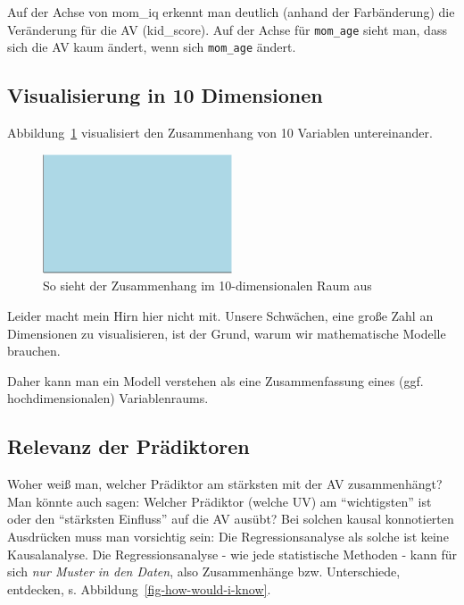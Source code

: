 \documentclass[
  a4paper,
  DIV=11]{scrreprt}
\theoremstyle{definition}
\theoremstyle{remark}
\begin{document}
Auf der Achse von mom\_iq erkennt man deutlich (anhand der Farbänderung)
die Veränderung für die AV (kid\_score). Auf der Achse für
\texttt{mom\_age} sieht man, dass sich die AV kaum ändert, wenn sich
\texttt{mom\_age} ändert.

\hypertarget{visualisierung-in-10-dimensionen}{%
\subsection{Visualisierung in 10
Dimensionen}\label{visualisierung-in-10-dimensionen}}

Abbildung~\ref{fig-ten-dims} visualisiert den Zusammenhang von 10
Variablen untereinander.

\begin{figure}

{\centering \includegraphics[width=0.5\textwidth,height=\textheight]{./metrische-AV_files/figure-pdf/fig-ten-dims-1.pdf}

}

\caption{\label{fig-ten-dims}So sieht der Zusammenhang im
10-dimensionalen Raum aus}

\end{figure}

Leider macht mein Hirn hier nicht mit. Unsere Schwächen, eine große Zahl
an Dimensionen zu visualisieren, ist der Grund, warum wir mathematische
Modelle brauchen.

Daher kann man ein Modell verstehen als eine Zusammenfassung eines (ggf.
hochdimensionalen) Variablenraums.

\hypertarget{relevanz-der-pruxe4diktoren}{%
\subsection{Relevanz der
Prädiktoren}\label{relevanz-der-pruxe4diktoren}}

Woher weiß man, welcher Prädiktor am stärksten mit der AV zusammenhängt?
Man könnte auch sagen: Welcher Prädiktor (welche UV) am ``wichtigsten''
ist oder den ``stärksten Einfluss'' auf die AV ausübt? Bei solchen
kausal konnotierten Ausdrücken muss man vorsichtig sein: Die
Regressionsanalyse als solche ist keine Kausalanalyse. Die
Regressionsanalyse - wie jede statistische Methoden - kann für sich
\emph{nur Muster in den Daten}, also Zusammenhänge bzw. Unterschiede,
entdecken, s. Abbildung~\ref{fig-how-would-i-know}.
\end{document}
